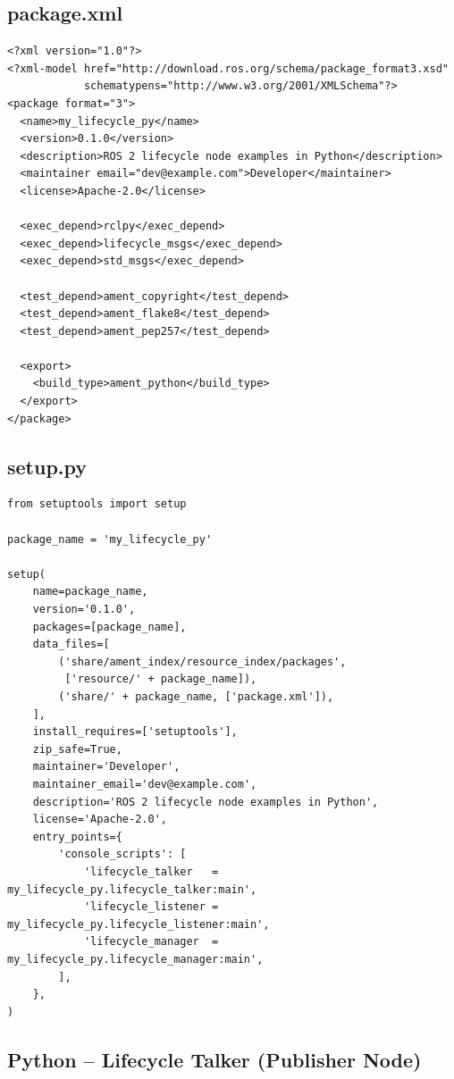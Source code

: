 \documentclass[11pt,a4paper]{csarticle}
\begin{document}
\subsection{package.xml}

\begin{lstlisting}[style=xml,caption={package.xml for the Python package}]
<?xml version="1.0"?>
<?xml-model href="http://download.ros.org/schema/package_format3.xsd"
            schematypens="http://www.w3.org/2001/XMLSchema"?>
<package format="3">
  <name>my_lifecycle_py</name>
  <version>0.1.0</version>
  <description>ROS 2 lifecycle node examples in Python</description>
  <maintainer email="dev@example.com">Developer</maintainer>
  <license>Apache-2.0</license>

  <exec_depend>rclpy</exec_depend>
  <exec_depend>lifecycle_msgs</exec_depend>
  <exec_depend>std_msgs</exec_depend>

  <test_depend>ament_copyright</test_depend>
  <test_depend>ament_flake8</test_depend>
  <test_depend>ament_pep257</test_depend>

  <export>
    <build_type>ament_python</build_type>
  </export>
</package>
\end{lstlisting}

\subsection{setup.py}

\begin{lstlisting}[style=python,caption={setup.py}]
from setuptools import setup

package_name = 'my_lifecycle_py'

setup(
    name=package_name,
    version='0.1.0',
    packages=[package_name],
    data_files=[
        ('share/ament_index/resource_index/packages',
         ['resource/' + package_name]),
        ('share/' + package_name, ['package.xml']),
    ],
    install_requires=['setuptools'],
    zip_safe=True,
    maintainer='Developer',
    maintainer_email='dev@example.com',
    description='ROS 2 lifecycle node examples in Python',
    license='Apache-2.0',
    entry_points={
        'console_scripts': [
            'lifecycle_talker   = my_lifecycle_py.lifecycle_talker:main',
            'lifecycle_listener = my_lifecycle_py.lifecycle_listener:main',
            'lifecycle_manager  = my_lifecycle_py.lifecycle_manager:main',
        ],
    },
)
\end{lstlisting}

\subsection{Python -- Lifecycle Talker (Publisher Node)}
\label{sec:py-talker}
\end{document}
